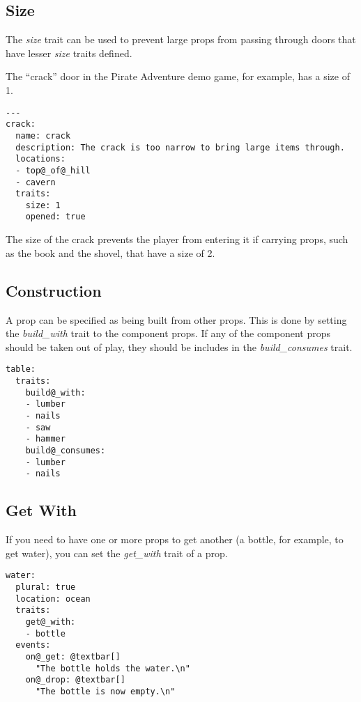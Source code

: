 \documentclass[letterpaper,10pt,english]{sphinxmanual}
\begin{document}
\subsection{Size}
\label{elements:size}
The \emph{size} trait can be used to prevent large props from passing through doors that have lesser \emph{size} traits defined.

The ``crack'' door in the Pirate Adventure demo game, for example, has a size of 1.

\begin{Verbatim}[commandchars=@\[\]]
---
crack:
  name: crack
  description: The crack is too narrow to bring large items through.
  locations:
  - top@_of@_hill
  - cavern
  traits:
    size: 1
    opened: true
\end{Verbatim}

The size of the crack prevents the player from entering it if carrying props, such as the book and the shovel, that have a size of 2.


\subsection{Construction}
\label{elements:construction}
A prop can be specified as being built from other props. This is done by setting the \emph{build\_with} trait to the component props. If any of the component props should be taken out of play, they should be includes in the \emph{build\_consumes} trait.

\begin{Verbatim}[commandchars=@\[\]]
table:
  traits:
    build@_with:
    - lumber
    - nails
    - saw
    - hammer
    build@_consumes:
    - lumber
    - nails
\end{Verbatim}


\subsection{Get With}
\label{elements:get-with}
If you need to have one or more props to get another (a bottle, for example, to get water), you can set the \emph{get\_with} trait of a prop.

\begin{Verbatim}[commandchars=@\[\]]
water:
  plural: true
  location: ocean
  traits:
    get@_with:
    - bottle
  events:
    on@_get: @textbar[]
      "The bottle holds the water.\n"
    on@_drop: @textbar[]
      "The bottle is now empty.\n"
\end{Verbatim}
\end{document}
